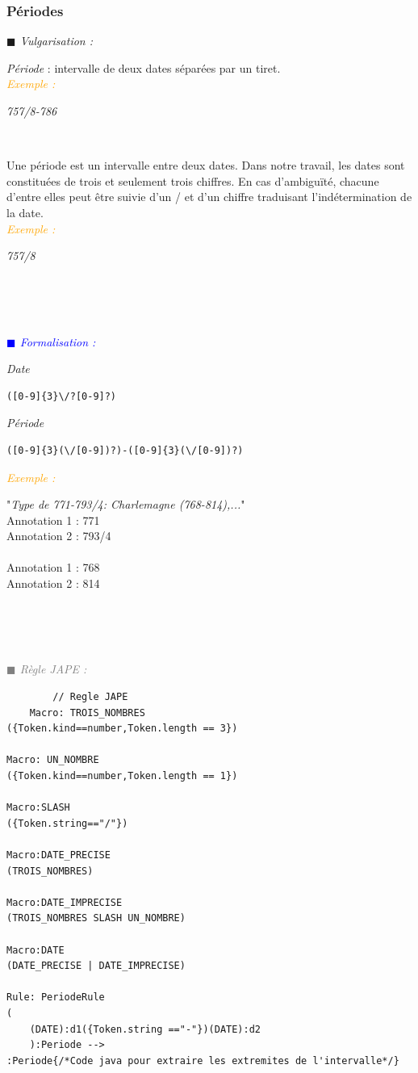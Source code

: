 \documentclass[a4paper, 11pt]{report}
\newenvironment{vulgarisation}
    {
    \textit{\textcolor{dark-blue}{$\blacksquare$  Vulgarisation : \\}}

    }
    {
    ~\\~\\
    }
\newenvironment{formalisation}
    {
    \textit{\textcolor{blue}{$\blacksquare$  Formalisation : \\}}
    }
    {
    ~\\~\\
    }
\newenvironment{codage}
    {
    \textit{\textcolor{gray}{$\blacksquare$  Règle JAPE : \\}}
    }
    {
    ~\\~\\
    }
\newenvironment{exemple}
    {
    \textit{\textcolor{orange}{
    Exemple : \\}}
    }
    {
    ~\\
    }
\begin{document}
    \subsubsection{Périodes}
\begin{vulgarisation}
    \textit{Période} : intervalle de deux dates séparées par un tiret.\\
    \begin{exemple}
        \textit{757/8-786}
    \end{exemple}
    
    Une période est un intervalle entre deux dates. Dans notre travail, les dates sont constituées de trois et seulement trois chiffres. En cas d'ambiguïté, chacune d'entre elles peut être suivie d'un \og/\fg{} et d'un chiffre traduisant l'indétermination de la date.\\
    \begin{exemple}
        \textit{757/8}
    \end{exemple}
    
\end{vulgarisation}
\begin{formalisation}
    \textit{Date}
    \begin{verbatim}
([0-9]{3}\/?[0-9]?)
    \end{verbatim}
    \textit{Période}
    \begin{verbatim}
([0-9]{3}(\/[0-9])?)-([0-9]{3}(\/[0-9])?)
    \end{verbatim}
    \begin{exemple}
        "\emph{Type de 771-793/4: Charlemagne (768-814),...}" \\
        Annotation 1 : 771 \\
        Annotation 2 : 793/4\\\\\noindent
        Annotation 1 : 768 \\
        Annotation 2 : 814
    \end{exemple}
\end{formalisation}
    \begin{codage}
    \begin{lstlisting}
        // Regle JAPE
    Macro: TROIS_NOMBRES
({Token.kind==number,Token.length == 3})

Macro: UN_NOMBRE
({Token.kind==number,Token.length == 1})

Macro:SLASH
({Token.string=="/"})

Macro:DATE_PRECISE
(TROIS_NOMBRES)

Macro:DATE_IMPRECISE
(TROIS_NOMBRES SLASH UN_NOMBRE)

Macro:DATE
(DATE_PRECISE | DATE_IMPRECISE)

Rule: PeriodeRule
(
    (DATE):d1({Token.string =="-"})(DATE):d2
    ):Periode -->
:Periode{/*Code java pour extraire les extremites de l'intervalle*/}
    \end{lstlisting}
    \end{codage}
    
\end{document}

